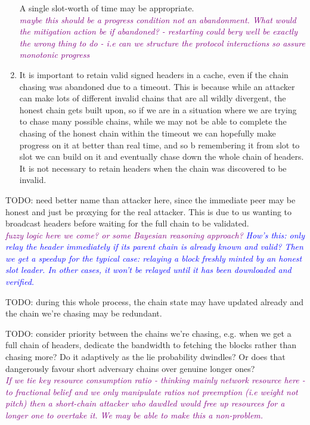 \documentclass{article}
\newcommand{\njd}[1]{\textcolor{purple}{\emph{#1}}}
\newcommand{\avieth}[1]{\textcolor{blue}{\emph{#1}}}
\theoremstyle{definition}{
  \newtheorem{lemma}{Lemma}[section] %
  \newtheorem{definition}[lemma]{Definition}
}
\theoremstyle{theorem}{
  \newtheorem{invariant}[lemma]{Invariant}
  \newtheorem{proofobligation}[lemma]{Proof Obligation}
}
\numberwithin{equation}{lemma}
\begin{document}
\begin{enumerate}
      A single slot-worth of time may be appropriate. \\ \njd{maybe this should be a progress condition not an abandonment. What would the mitigation action be if abandoned? - restarting could bery well be exactly the wrong thing to do - i.e can we structure the protocol interactions so assure monotonic progress}
\item It is important to retain valid signed headers in a cache, even if the
      chain chasing was abandoned due to a timeout. This is because while an
      attacker can make lots of different invalid chains that are all wildly
      divergent, the honest chain gets built upon, so if we are in a situation
      where we are trying to chase many possible chains, while we may not be
      able to complete the chasing of the honest chain within the timeout we
      can hopefully make progress on it at better than real time, and so b
      remembering it from slot to slot we can build on it and eventually chase
      down the whole chain of headers. It is not necessary to retain headers
      when the chain was discovered to be invalid.
\end{enumerate}

TODO: need better name than attacker here, since the immediate peer may be
honest and just be proxying for the real attacker. This is due to us wanting
to broadcast headers before waiting for the full chain to be validated.\\
\njd{fuzzy logic here we come? or some Bayesian reasoning approach?}
\avieth{How's this: only relay the header immediately if its parent chain is
  already known and valid? Then we get a speedup for the typical case: relaying
  a block freshly minted by an honest slot leader. In other cases, it won't be
  relayed until it has been downloaded and verified.}

TODO: during this whole process, the chain state may have updated already and
the chain we're chasing may be redundant.

TODO: consider priority between the chains we're chasing, e.g. when we get a
full chain of headers, dedicate the bandwidth to fetching the blocks rather
than chasing more? Do it adaptively as the lie probability dwindles? Or does
that dangerously favour short adversary chains over genuine longer ones? \\

\njd{If we tie key resource consumption ratio - thinking mainly
  network resource here - to fractional belief and we only manipulate
  ratios not preemption (i.e weight not pitch) then a short-chain
  attacker who dawdled would free up resources for a longer one to
  overtake it. We may be able to make this a non-problem.}
\end{document}
